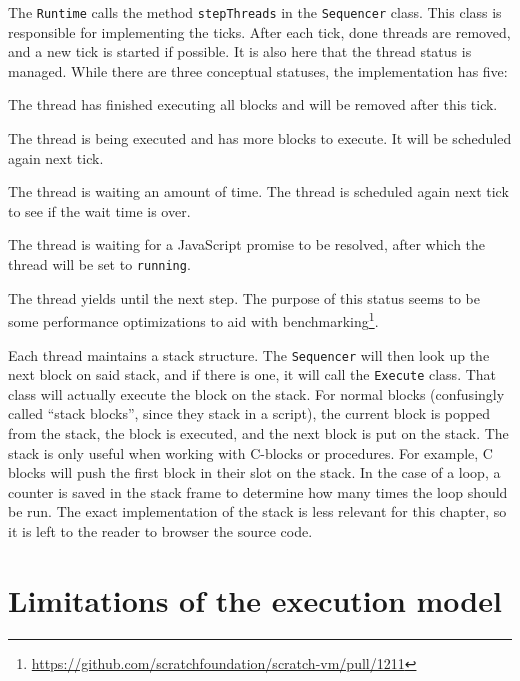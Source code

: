 \documentclass[../main]{subfiles}
\begin{document}
The \texttt{Runtime} calls the method \texttt{stepThreads} in the \texttt{Sequencer} class.
This class is responsible for implementing the ticks.
After each tick, done threads are removed, and a new tick is started if possible.
It is also here that the thread status is managed.
While there are three conceptual statuses, the implementation has five:
\begin{description}[noitemsep]
    \item[\texttt{done}] The thread has finished executing all blocks and will be removed after this tick.
    \item[\texttt{running}] The thread is being executed and has more blocks to execute.
        It will be scheduled again next tick.
    \item[\texttt{yield}] The thread is waiting an amount of time.
        The thread is scheduled again next tick to see if the wait time is over.
    \item[\texttt{promise wait}] The thread is waiting for a JavaScript promise to be resolved, after which the thread will be set to \texttt{running}.
    \item[\texttt{yield tick}] The thread yields until the next step.
        The purpose of this status seems to be some performance optimizations to aid with benchmarking\footnote{\url{https://github.com/scratchfoundation/scratch-vm/pull/1211}}.
\end{description}

Each thread maintains a stack structure.
The \texttt{Sequencer} will then look up the next block on said stack, and if there is one, it will call the \texttt{Execute} class.
That class will actually execute the block on the stack.
For normal blocks (confusingly called ``stack blocks'', since they stack in a script), the current block is popped from the stack, the block is executed, and the next block is put on the stack.
The stack is only useful when working with C-blocks or procedures.
For example, C blocks will push the first block in their slot on the stack.
In the case of a loop, a counter is saved in the stack frame to determine how many times the loop should be run.
The exact implementation of the stack is less relevant for this chapter, so it is left to the reader to browser the source code.

\section{Limitations of the execution model}\label{sec:limitations-of-the-execution-model-for-the-debugger}
\end{document}
